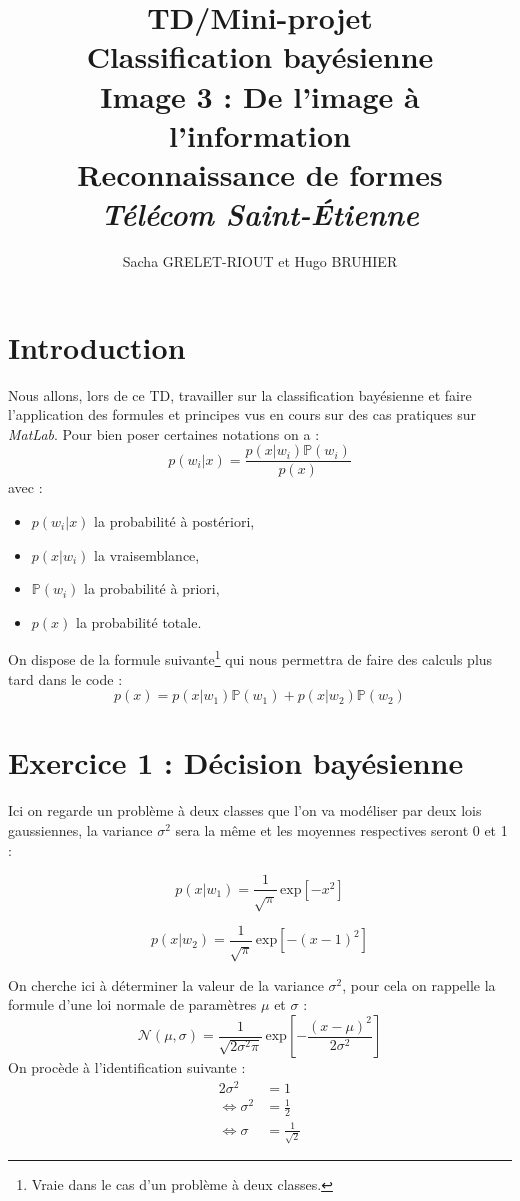 \documentclass[11pt,a4paper]{article}
\author{Sacha GRELET-RIOUT et Hugo BRUHIER}
\title{TD/Mini-projet\\Classification bayésienne\\ \normalsize Image 3 : De l'image à l'information\\Reconnaissance de formes\\\emph{Télécom Saint-Étienne}}
\date{}
\begin{document}
\maketitle


\section{Introduction}

Nous allons, lors de ce TD, travailler sur la classification bayésienne et faire l'application des formules  et principes vus en cours sur des cas pratiques sur \emph{MatLab}. Pour bien poser certaines notations on a :
\begin{equation}
p(w_i|x) = \frac{p(x|w_i)\mathbb{P}(w_i)}{p(x)}
\end{equation}
avec :
\begin{itemize}
\item $p(w_i|x)$ la probabilité à postériori,
\item $p(x|w_i)$ la vraisemblance,
\item $\mathbb{P}(w_i)$ la probabilité à priori,
\item $p(x)$ la probabilité totale.
\end{itemize}
On dispose de la formule suivante\footnote{Vraie dans le cas d'un problème à deux classes.} qui nous permettra de faire des calculs plus tard dans le code :
\begin{equation}
p(x) = p(x|w_1)\mathbb{P}(w_1) + p(x|w_2)\mathbb{P}(w_2)
\end{equation}


\section{Exercice 1 : Décision bayésienne}

Ici on regarde un problème à deux classes que l'on va modéliser par deux lois gaussiennes, la variance $\sigma^2$ sera la même et les moyennes respectives seront 0 et 1 :

\begin{equation}
p(x|w_1) = \frac{1}{\sqrt{\pi}}\,\text{exp}\left[-x^2\right]
\end{equation}

\begin{equation}
p(x|w_2) = \frac{1}{\sqrt{\pi}}\,\text{exp}\left[-(x-1)^2\right]
\end{equation}

On cherche ici à déterminer la valeur de la variance $\sigma^2$, pour cela on rappelle la formule d'une loi normale de paramètres $\mu$ et $\sigma$ :
$$
\mathcal{N}(\mu,\sigma) = \frac{1}{\sqrt{2\sigma^2\pi}}\,\text{exp}\left[-\frac{(x-\mu)^2}{2\sigma^2}\right]
$$
On procède à l'identification suivante :
\begin{align*}
2 \sigma^2 &= 1 \\
\Leftrightarrow \sigma^2 &= \frac{1}{2} \\
\Leftrightarrow \sigma &= \frac{1}{\sqrt{2}}
\end{align*}
\end{document}
